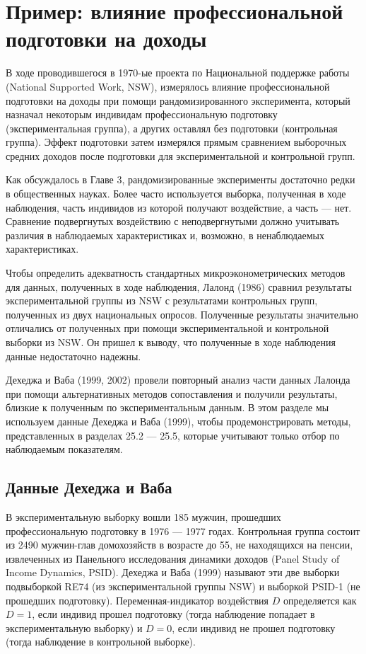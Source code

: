 \section{Пример: влияние профессиональной подготовки на доходы}

В ходе проводившегося в 1970-ые проекта по Национальной поддержке работы (National Supported Work, NSW), измерялось влияние профессиональной подготовки на доходы при помощи рандомизированного эксперимента, который назначал некоторым индивидам профессиональную подготовку (экспериментальная группа), а других оставлял без подготовки (контрольная группа). Эффект подготовки затем измерялся прямым сравнением выборочных средних доходов после подготовки для экспериментальной и контрольной групп. 

Как обсуждалось в Главе 3, рандомизированные эксперименты достаточно редки в общественных науках. Более часто используется выборка, полученная в ходе наблюдения, часть индивидов из которой получают воздействие, а часть --- нет. Сравнение подвергнутых воздействию с неподвергнутыми должно учитывать различия в наблюдаемых характеристиках и, возможно, в ненаблюдаемых характеристиках. 

Чтобы определить адекватность стандартных микроэконометрических методов для данных, полученных в ходе наблюдения, Лалонд (1986) сравнил результаты экспериментальной группы из NSW с результатами контрольных групп, полученных из двух национальных опросов. Полученные результаты значительно отличались от полученных при помощи экспериментальной и контрольной выборки из NSW. Он пришел к выводу, что полученные в ходе наблюдения данные недостаточно надежны. 

Дехеджа и Ваба (1999, 2002) провели повторный анализ части данных Лалонда при помощи альтернативных методов сопоставления и получили результаты, близкие к полученным по экспериментальным данным. В этом разделе мы используем данные Дехеджа и Ваба (1999), чтобы продемонстрировать  методы, представленных в разделах 25.2 --- 25.5, которые учитывают только отбор по наблюдаемым показателям. 

\subsection{Данные Дехеджа и Ваба}

В экспериментальную выборку вошли 185 мужчин, прошедших профессиональную подготовку в 1976 --- 1977 годах. Контрольная группа состоит из 2490 мужчин-глав домохозяйств в возрасте до 55, не находящихся на пенсии, извлеченных из Панельного исследования динамики доходов (Panel Study of Income Dynamics, PSID). Дехеджа и Ваба (1999) называют эти две выборки подвыборкой RE74 (из экспериментальной группы NSW) и выборкой PSID-1 (не прошедших подготовку). Переменная-индикатор воздействия $D$ определяется как $D = 1$, если индивид прошел подготовку (тогда наблюдение попадает в экспериментальную выборку) и $D = 0$, если индивид не прошел подготовку (тогда наблюдение в контрольной выборке). 

